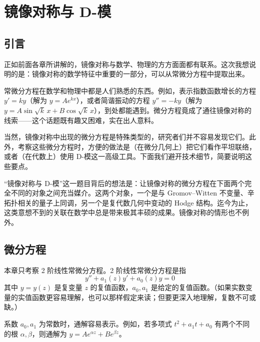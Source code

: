 \renewcommand{\thesection}{\arabic{section}}

\chapter{镜像对称与 D-模}
\section{引言}

正如前面各章所讲解的，镜像对称与数学、物理的方方面面都有联系。这次我想说明的是：镜像对称的数学特征中重要的一部分，可以从常微分方程中提取出来。

常微分方程在数学和物理中都是人们熟悉的东西。例如，表示指数函数增长的方程 $y'=ky$（解为 $y=Ae^{kx}$），或者简谐振动的方程 $y''=-ky$（解为 $y=A\sin\sqrt{k}\,x+B\cos\sqrt{k}\,x$），到处都能遇到。微分方程竟成了通往镜像对称的线索——这个话题既有趣又困难，实在出人意料。

当然，镜像对称中出现的微分方程是特殊类型的，研究者们并不容易发现它们。此外，考察这些微分方程时，方便的做法是（在微分几何上）把它们看作平坦联络，或者（在代数上）使用 D-模这一高级工具。下面我们避开技术细节，简要说明这些要点。

“镜像对称与 D-模”这一题目背后的想法是：让镜像对称的微分方程在下面两个完全不同的对象之间充当媒介。这两个对象，一个是与 Gromov--Witten 不变量、辛拓扑相关的量子上同调，另一个是复代数几何中变动的 Hodge 结构。迄今为止，这类意想不到的关联在数学中总是带来极其丰硕的成果。镜像对称的情形也不例外。
\section{微分方程}

本章只考察 2 阶线性常微分方程。2 阶线性常微分方程是指
\[
y''+a_1(z)y'+a_0(z)y=0
\]
其中 $y=y(z)$ 是复变量 $z$ 的复值函数，$a_0,a_1$ 是给定的复值函数。（如果实数变量的实值函数更容易理解，也可以那样假定来读；但要更深入地理解，复数不可或缺。）

系数 $a_0,a_1$ 为常数时，通解容易表示。例如，若多项式 $t^2+a_1t+a_0$ 有两个不同的根 $\alpha,\beta$，则通解为 $y=Ae^{\alpha z}+Be^{\beta z}$。

